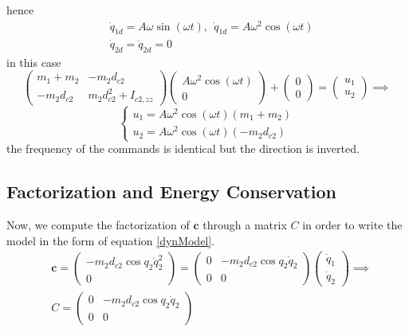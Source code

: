 \documentclass[10pt, a4paper]{report}
\begin{document}
hence 
\begin{align}
    &\dot q_{1d}=A\omega\sin(\omega t), \ \ \dot q_{1d}=A\omega^2\cos(\omega t)\\ 
    &\dot q_{2d}=\ddot q_{2d}=0
\end{align}
in this case
\begin{equation}
    \begin{pmatrix}
        m_1+m_2 & -m_2d_{c2}\\ 
       -m_2d_{c2}& m_2d_{c2}^2+I_{c2,zz}
    \end{pmatrix}\begin{pmatrix}
        A\omega^2\cos(\omega t)\\ 0
    \end{pmatrix}+\begin{pmatrix}
       0 \\ 0
    \end{pmatrix}=\begin{pmatrix}
        u_1\\ u_2
    \end{pmatrix}\implies
\end{equation}\begin{equation}
    \begin{cases}
        u_1=A\omega^2\cos(\omega t)(m_1+m_2)\\ 
        u_2=A\omega^2\cos(\omega t)(-m_2d_{c2})
    \end{cases}
\end{equation}
the frequency of the commands is identical but the direction is inverted.\subsection{Factorization and Energy Conservation}\label{FactorAndEnergyCons}
Now, we compute the factorization of $\mathbf c$ through a matrix $C$ in order to write the model in the form of equation \eqref{dynModel}.\begin{align}
    &\mathbf c = \begin{pmatrix}
        -m_2d_{c2}\cos q_2\dot q_2^2\\ 
        0
    \end{pmatrix} =\begin{pmatrix}
        0&-m_2d_{c2}\cos q_2\dot q_2\\ 
        0&0
    \end{pmatrix}\begin{pmatrix}
        \dot q_1 \\ 
        \dot q_2
    \end{pmatrix}\implies \\ &C=\begin{pmatrix}
        0&-m_2d_{c2}\cos q_2\dot q_2\\ 
        0&0
    \end{pmatrix}
\end{align}
\end{document}
